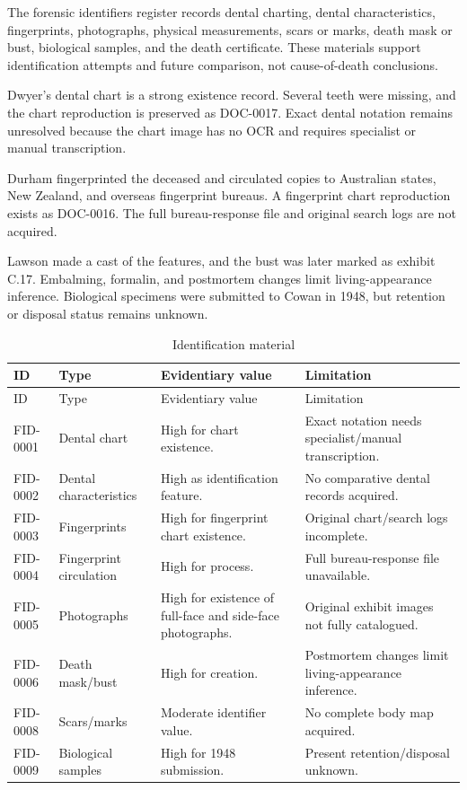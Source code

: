 The forensic identifiers register records dental charting, dental characteristics, fingerprints, photographs, physical measurements, scars or marks, death mask or bust, biological samples, and the death certificate. These materials support identification attempts and future comparison, not cause-of-death conclusions.

Dwyer's dental chart is a strong existence record. Several teeth were missing, and the chart reproduction is preserved as DOC-0017. Exact dental notation remains unresolved because the chart image has no OCR and requires specialist or manual transcription.

Durham fingerprinted the deceased and circulated copies to Australian states, New Zealand, and overseas fingerprint bureaus. A fingerprint chart reproduction exists as DOC-0016. The full bureau-response file and original search logs are not acquired.

Lawson made a cast of the features, and the bust was later marked as exhibit C.17. Embalming, formalin, and postmortem changes limit living-appearance inference. Biological specimens were submitted to Cowan in 1948, but retention or disposal status remains unknown.

\begingroup
\scriptsize
\setlength{\tabcolsep}{2pt}
\renewcommand{\arraystretch}{1.12}
\begin{longtable}{>{\raggedright\arraybackslash}p{}>{\raggedright\arraybackslash}p{}>{\raggedright\arraybackslash}p{}>{\raggedright\arraybackslash}p{}}
\caption{Identification material}\label{tab:chapter9-identification-material}\\
\toprule
ID & Type & Evidentiary value & Limitation \\
\midrule
\endfirsthead
\toprule
ID & Type & Evidentiary value & Limitation \\
\midrule
\endhead
FID-0001 & Dental chart & High for chart existence. & Exact notation needs specialist/manual transcription. \\
FID-0002 & Dental characteristics & High as identification feature. & No comparative dental records acquired. \\
FID-0003 & Fingerprints & High for fingerprint chart existence. & Original chart/search logs incomplete. \\
FID-0004 & Fingerprint circulation & High for process. & Full bureau-response file unavailable. \\
FID-0005 & Photographs & High for existence of full-face and side-face photographs. & Original exhibit images not fully catalogued. \\
FID-0006 & Death mask/bust & High for creation. & Postmortem changes limit living-appearance inference. \\
FID-0008 & Scars/marks & Moderate identifier value. & No complete body map acquired. \\
FID-0009 & Biological samples & High for 1948 submission. & Present retention/disposal unknown. \\
\bottomrule
\end{longtable}
\endgroup

